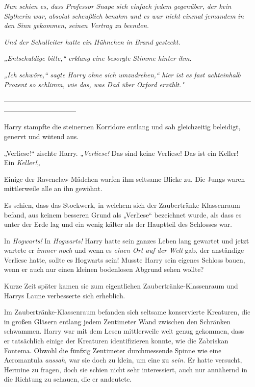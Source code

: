 {\emph{Nun schien es, dass Professor Snape sich einfach jedem gegenüber, der kein Slytherin war, absolut scheußlich benahm und es war nicht einmal jemandem} \emph{\emph{in den Sinn gekommen,}} \emph{seinen Vertrag zu beenden.}

\emph{Und der Schulleiter hatte ein Hühnchen in Brand gesteckt.}

\emph{„Entschuldige bitte,“ erklang eine besorgte Stimme hinter ihm.}

\emph{„Ich schwöre,“ sagte Harry ohne sich umzudrehen,“ hier ist es fast achteinhalb Prozent so schlimm, wie} \emph{das, was Dad über Oxford erzählt."}

--------------------------------------------------------------------------------------------------------------------------------------------

\hfill\break Harry stampfte die steinernen Korridore entlang und sah gleichzeitig beleidigt, genervt und wütend aus.

„Verliese!“ zischte Harry. „\emph{Verliese!} Das sind keine Verliese! Das ist ein Keller! Ein \emph{Keller!}„

Einige der Ravenclaw-Mädchen warfen ihm seltsame Blicke zu. Die Jungs waren mittlerweile alle an ihn gewöhnt.

Es schien, dass das Stockwerk, in welchem sich der Zaubertränke-Klassenraum befand, aus keinem besseren Grund als „Verliese“ bezeichnet wurde, als dass es unter der Erde lag und ein wenig kälter als der Hauptteil des Schlosses war.

In \emph{Hogwarts!} In \emph{Hogwarts!} Harry hatte sein ganzes Leben lang gewartet und jetzt wartete er \emph{immer noch} und wenn es \emph{einen Ort auf der Welt} gab, der anständige Verliese hatte, sollte es Hogwarts sein! Musste Harry sein eigenes Schloss bauen, wenn er auch nur einen kleinen bodenlosen Abgrund sehen wollte?

Kurze Zeit später kamen sie zum eigentlichen Zaubertränke-Klassenraum und Harrys Laune verbesserte sich erheblich.

Im Zaubertränke-Klassenraum befanden sich seltsame konservierte Kreaturen, die in großen Gläsern entlang jedem Zentimeter Wand zwischen den Schränken schwammen. Harry war mit dem Lesen mittlerweile weit genug gekommen, dass er tatsächlich einige der Kreaturen identifizieren konnte, wie die Zabriskan Fontema. Obwohl die fünfzig Zentimeter durchmessende Spinne wie eine Acromantula \emph{aussah}, war sie doch zu klein, um eine zu \emph{sein.} Er hatte versucht, Hermine zu fragen, doch sie schien nicht sehr interessiert, auch nur annähernd in die Richtung zu schauen, die er andeutete.

}
